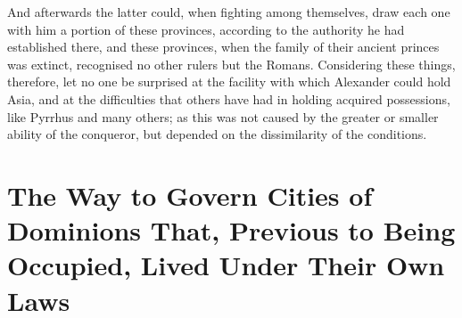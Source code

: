 \documentclass[12pt,letterpaper]{memoir}
\begin{document}
And afterwards the latter could, when fighting among themselves, draw
each one with him a portion of these provinces, according to the
authority he had established there, and these provinces, when the
family of their ancient princes was extinct, recognised no other rulers
but the Romans. Considering these things, therefore, let no one be
surprised at the facility with which Alexander could hold Asia, and at
the difficulties that others have had in holding acquired possessions,
like Pyrrhus and many others; as this was not caused by the greater or
smaller ability of the conqueror, but depended on the dissimilarity of
the conditions.

\chapter{The Way to Govern Cities of Dominions That, Previous to Being Occupied, Lived Under Their Own Laws}
\end{document}
